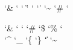 

\ifdefined \xmlcatcodesn \else \newcatcodetable \xmlcatcodesn \fi %
\ifdefined \xmlcatcodese \else \newcatcodetable \xmlcatcodese \fi %
\ifdefined \xmlcatcodesr \else \newcatcodetable \xmlcatcodesr \fi %

\startcatcodetable \xmlcatcodesn
    \catcode\tabasciicode      \spacecatcode
    \catcode\endoflineasciicode\endoflinecatcode
    \catcode\formfeedasciicode \endoflinecatcode
    \catcode\spaceasciicode    \spacecatcode
    \catcode\endoffileasciicode\ignorecatcode
    \catcode`\&                \activecatcode
    \catcode`\<                \activecatcode
    \catcode`\>                \othercatcode
    \catcode`\"                \othercatcode %
    \catcode`\/                \othercatcode %
    \catcode`\'                \othercatcode %
    \catcode`\~                \othercatcode %
    \catcode`\#                \othercatcode %
    \catcode`\\                \othercatcode %
\stopcatcodetable

\startcatcodetable \xmlcatcodese
    \catcode\tabasciicode      \spacecatcode
    \catcode\endoflineasciicode\endoflinecatcode
    \catcode\formfeedasciicode \endoflinecatcode
    \catcode\spaceasciicode    \spacecatcode
    \catcode\endoffileasciicode\ignorecatcode
    \catcode`\&                \activecatcode
    \catcode`\<                \activecatcode
    \catcode`\>                \activecatcode
    \catcode`\#                \activecatcode
    \catcode`\$                \activecatcode
    \catcode`\%                \activecatcode
    \catcode`\\                \activecatcode
    \catcode`\^                \activecatcode
    \catcode`\_                \activecatcode
    \catcode`\{                \activecatcode
    \catcode`\}                \activecatcode
    \catcode`\|                \activecatcode
    \catcode`\~                \activecatcode
\stopcatcodetable

